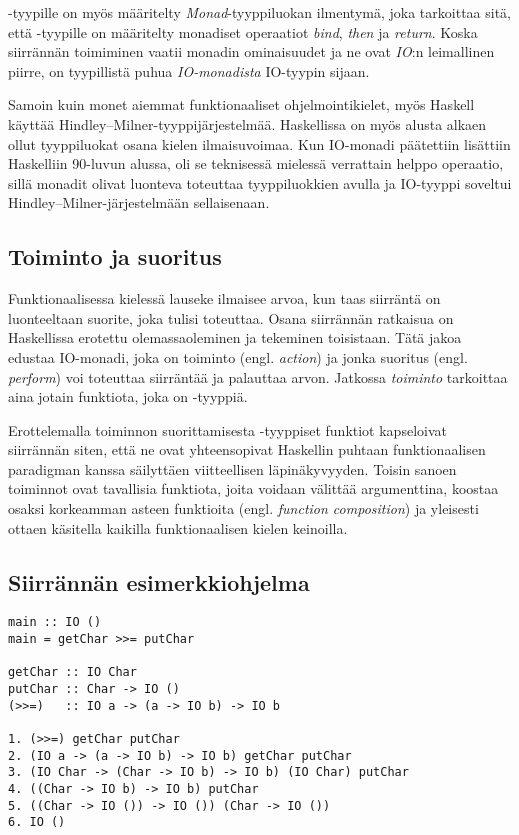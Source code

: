 \documentclass[finnish]{tktltiki2}
\begin{document}
-tyypille on myös määritelty \emph{Monad}-tyyppiluokan ilmentymä, joka tarkoittaa sitä,
että -tyypille on määritelty monadiset operaatiot \emph{bind}, \emph{then} ja
\emph{return}. Koska siirrännän toimiminen vaatii monadin ominaisuudet ja ne ovat \emph{IO}:n
leimallinen piirre, on tyypillistä puhua \emph{IO-monadista} IO-tyypin sijaan.

Samoin kuin monet aiemmat funktionaaliset ohjelmointikielet, myös Haskell käyttää
Hindley--Milner-tyyppijärjestelmää. Haskellissa on myös alusta alkaen ollut tyyppiluokat osana
kielen ilmaisuvoimaa. Kun IO-monadi päätettiin lisättiin Haskelliin 90-luvun alussa, oli se
teknisessä mielessä verrattain helppo operaatio, sillä monadit olivat luonteva toteuttaa
tyyppiluokkien avulla ja IO-tyyppi soveltui Hindley--Milner-järjestelmään sellaisenaan.

\subsection{Toiminto ja suoritus}

Funktionaalisessa kielessä lauseke ilmaisee arvoa, kun taas siirräntä on luonteeltaan suorite, joka
tulisi toteuttaa. Osana siirrännän ratkaisua on Haskellissa erotettu olemassaoleminen ja tekeminen
toisistaan. Tätä jakoa edustaa IO-monadi, joka on toiminto (engl. \emph{action}) ja jonka suoritus
(engl. \emph{perform}) voi toteuttaa siirräntää ja palauttaa arvon. Jatkossa \emph{toiminto}
tarkoittaa aina jotain funktiota, joka on -tyyppiä.

Erottelemalla toiminnon suorittamisesta -tyyppiset funktiot kapseloivat siirrännän siten,
että ne ovat yhteensopivat Haskellin puhtaan funktionaalisen paradigman kanssa säilyttäen
viitteellisen läpinäkyvyyden. Toisin sanoen toiminnot ovat tavallisia funktiota, joita voidaan
välittää argumenttina, koostaa osaksi korkeamman asteen funktioita (engl. \emph{function
composition}) ja yleisesti ottaen käsitella kaikilla funktionaalisen kielen keinoilla.

\subsection{Siirrännän esimerkkiohjelma}

\begin{lstlisting}[float,label={lst:ioprog},caption={IO-ohjelma ja sen evaluaatio}]
main :: IO ()
main = getChar >>= putChar

getChar :: IO Char
putChar :: Char -> IO ()
(>>=)   :: IO a -> (a -> IO b) -> IO b

1. (>>=) getChar putChar
2. (IO a -> (a -> IO b) -> IO b) getChar putChar
3. (IO Char -> (Char -> IO b) -> IO b) (IO Char) putChar
4. ((Char -> IO b) -> IO b) putChar
5. ((Char -> IO ()) -> IO ()) (Char -> IO ())
6. IO ()
\end{lstlisting}
\end{document}
